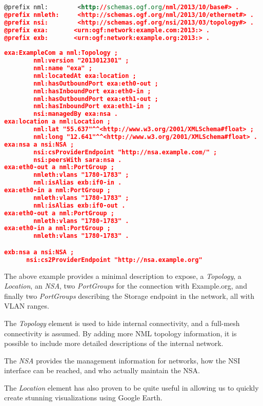 \documentclass[12pt]{article}  %
\begin{document}
\begin{lstlisting}[language=XML]
@prefix nml:        <http://schemas.ogf.org/nml/2013/10/base#> .
@prefix nmleth:     <http://schemas.ogf.org/nml/2013/10/ethernet#> .
@prefix nsi:        <http://schemas.ogf.org/nsi/2013/03/topology#> .
@prefix exa:       <urn:ogf:network:example.com:2013:> .
@prefix exb:       <urn:ogf:network:example.org:2013:> .
  
exa:ExampleCom a nml:Topology ;
        nml:version "2013012301" ;
        nml:name "exa" ;
        nml:locatedAt exa:location ;
        nml:hasOutboundPort exa:eth0-out ;
        nml:hasInboundPort exa:eth0-in ;
        nml:hasOutboundPort exa:eth1-out ;
        nml:hasInboundPort exa:eth1-in ;
        nsi:managedBy exa:nsa .
exa:location a nml:Location ;
        nml:lat "55.637"^^<http://www.w3.org/2001/XMLSchema#float> ;
        nml:long "12.641"^^<http://www.w3.org/2001/XMLSchema#float> .
exa:nsa a nsi:NSA ;
        nsi:csProviderEndpoint "http://nsa.example.com/" ;
        nsi:peersWith sara:nsa .
exa:eth0-out a nml:PortGroup ;
        nmleth:vlans "1780-1783" ;
        nml:isAlias exb:if0-in .
exa:eth0-in a nml:PortGroup ;
        nmleth:vlans "1780-1783" ;
        nml:isAlias exb:if0-out .
exa:eth0-out a nml:PortGroup ;
        nmleth:vlans "1780-1783" .
exa:eth0-in a nml:PortGroup ;
        nmleth:vlans "1780-1783" .

exb:nsa a nsi:NSA ;
      nsi:cs2ProviderEndpoint "http://nsa.example.org"
\end{lstlisting}



 The above example provides a minimal description to expose, 
a \emph{Topology}, a \emph{Location}, an \emph{NSA}, two \emph{PortGroups} for the connection with Example.org, 
and finally two \emph{PortGroups} describing the Storage endpoint in the network, all 
with VLAN ranges.

 The \emph{Topology} element is used to hide internal connectivity, and 
a full-mesh connectivity is assumed. By adding more NML topology information, it is possible 
to include more detailed descriptions of the internal network.


 The \emph{NSA} provides the management information for networks, how 
the NSI interface can be reached, and who actually maintain the NSA.

 The \emph{Location} element has also proven to be quite useful in allowing 
us to quickly create stunning visualizations using Google Earth.
\end{document}
